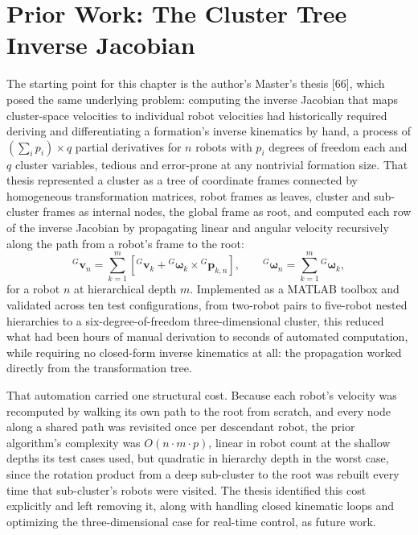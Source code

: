 \documentclass[12pt, letterpaper, oneside]{report}
\begin{document}
\section{Prior Work: The Cluster Tree Inverse Jacobian}
\label{sec:cb_prior_work}

The starting point for this chapter is the author's Master's thesis [66],
which posed the same underlying problem: computing the inverse Jacobian that maps
cluster-space velocities to individual robot velocities had historically
required deriving and differentiating a formation's inverse kinematics by
hand, a process of $\left(\sum_i p_i\right)\times q$ partial derivatives for
$n$ robots with $p_i$ degrees of freedom each and $q$ cluster variables,
tedious and error-prone at any nontrivial formation size. That thesis
represented a cluster as a tree of coordinate frames connected by
homogeneous transformation matrices, robot frames as leaves, cluster and
sub-cluster frames as internal nodes, the global frame as root, and computed
each row of the inverse Jacobian by propagating linear and angular velocity
recursively along the path from a robot's frame to the root:
\begin{equation}
{}^G\mathbf{v}_n = \sum_{k=1}^m \left[{}^G\mathbf{v}_k + {}^G\boldsymbol{\omega}_k \times {}^G\mathbf{p}_{k,n}\right],
\qquad
{}^G\boldsymbol{\omega}_n = \sum_{k=1}^m {}^G\boldsymbol{\omega}_k,
\end{equation}
for a robot $n$ at hierarchical depth $m$. Implemented as a MATLAB toolbox
and validated across ten test configurations, from two-robot pairs to
five-robot nested hierarchies to a six-degree-of-freedom three-dimensional
cluster, this reduced what had been hours of manual derivation to seconds of
automated computation, while requiring no closed-form inverse kinematics at
all: the propagation worked directly from the transformation tree.

That automation carried one structural cost. Because each robot's velocity
was recomputed by walking its own path to the root from scratch, and every
node along a shared path was revisited once per descendant robot, the
prior algorithm's complexity was $O(n\cdot m\cdot p)$, linear in robot count
at the shallow depths its test cases used, but quadratic in hierarchy depth
in the worst case, since the rotation product from a deep sub-cluster to the
root was rebuilt every time that sub-cluster's robots were visited. The
thesis identified this cost explicitly and left removing it, along with
handling closed kinematic loops and optimizing the three-dimensional case
for real-time control, as future work.
\end{document}
